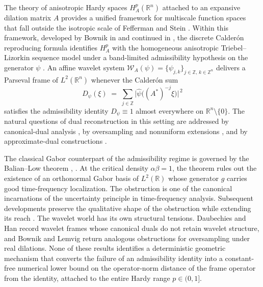 \documentclass[pdflatex,sn-basic,Numbered]{sn-jnl}
\theoremstyle{thmstyleone}%
\theoremstyle{thmstylethree}%
\begin{document}
The theory of anisotropic Hardy spaces $H^p_A(\mathbb{R}^n)$ attached to
an expansive dilation matrix $A$ provides a unified framework for
multiscale function spaces that fall outside the isotropic scale of
Fefferman and Stein \cite{FeffermanStein1972}. Within this framework, developed by Bownik in
\cite{Bownik2003} and continued in
\cite{Bownik2007,BownikHo2005,Baode2015,BownikWang2023}, the discrete
Calder\'on reproducing formula identifies $H^p_A$ with the homogeneous
anisotropic Triebel--Lizorkin sequence model under a band-limited
admissibility hypothesis on the generator $\psi$
\cite[Definition~2.12]{Bownik2007}. An affine wavelet system
$\mathcal{W}_A(\psi) = \{ \psi_{j,k} \}_{j \in \mathbb{Z},\, k \in
	\mathbb{Z}^n}$ \cite{Daubechies1992,Christensen2016} delivers a Parseval
frame of $L^2(\mathbb{R}^n)$ whenever the Calder\'on sum
\begin{equation*}
	D_\psi(\xi) \;=\; \sum_{j \in \mathbb{Z}}
	\bigl| \widehat{\psi}\bigl( (A^{*})^{-j} \xi \bigr) \bigr|^{\,2}
\end{equation*}
satisfies the admissibility identity $D_\psi \equiv 1$ almost everywhere
on $\mathbb{R}^n \setminus \{0\}$. The natural questions of dual
reconstruction in this setting are addressed by canonical-dual analysis
\cite{DAUBECHIES2002269}, by oversampling and nonuniform extensions
\cite{Bownik2012,KHOLE2020,Younu2018}, and by approximate-dual
constructions \cite{Feichtinger2013,BENAVENTE2022125841}.

The classical Gabor counterpart of the admissibility regime is governed
by the Balian--Low theorem \cite[Theorem~4.1.1]{Daubechies1992},
\cite[Theorems~8.4.1 and~8.4.5]{Karlheinz2001}. At the critical density
$\alpha \beta = 1$, the theorem rules out the existence of an
orthonormal Gabor basis of $L^2(\mathbb{R})$ whose generator $g$ carries
good time-frequency localization. The obstruction is one of the
canonical incarnations of the uncertainty principle in time-frequency
analysis. Subsequent developments preserve the qualitative shape of the
obstruction while extending its reach
\cite{Andrei2025,Fu2011,Karlheinz2001}. The wavelet world has its own
structural tensions. Daubechies and Han \cite{DAUBECHIES2002269} record
wavelet frames whose canonical duals do not retain wavelet structure,
and Bownik and Lemvig \cite{Bownik2012} return analogous obstructions
for oversampling under real dilations. None of these results identifies
a deterministic geometric mechanism that converts the failure of an
admissibility identity into a constant-free numerical lower bound on
the operator-norm distance of the frame operator from the identity,
attached to the entire Hardy range $p \in (0, 1]$.
\end{document}
